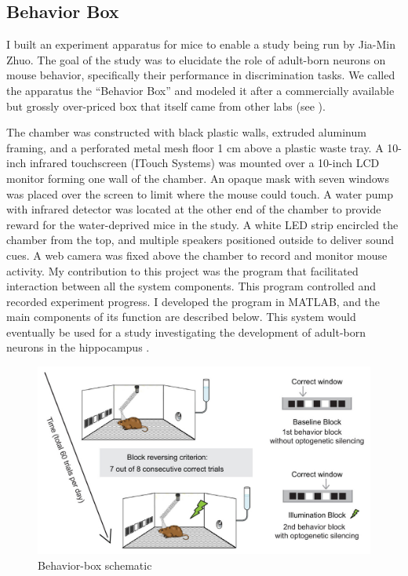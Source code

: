 \subsection{Behavior Box}\label{sec:behavior-box}

I built an experiment apparatus for mice to enable a study being run by Jia-Min Zhuo.
The goal of the study was to elucidate the role of adult-born neurons on mouse behavior, specifically their performance in discrimination tasks.
We called the apparatus the ``Behavior Box'' and modeled it after a commercially available but grossly over-priced box that itself came from other labs (see \cite{McLelland_2015}).

The chamber was constructed with black plastic walls, extruded aluminum framing, and a perforated metal mesh floor 1 cm above a plastic waste tray.
A 10-inch infrared touchscreen (ITouch Systems) was mounted over a 10-inch LCD monitor forming one wall of the chamber.
An opaque mask with seven windows was placed over the screen to limit where the mouse could touch.
A water pump with infrared detector was located at the other end of the chamber to provide reward for the water-deprived mice in the study.
A white LED strip encircled the chamber from the top, and multiple speakers positioned outside to deliver sound cues.
A web camera was fixed above the chamber to record and monitor mouse activity.
My contribution to this project was the program that facilitated interaction between all the system components.
This program controlled and recorded experiment progress.
I developed the program in MATLAB, and the main components of its function are described below.
This system would eventually be used for a study investigating the development of adult-born neurons in the hippocampus \cite{Zhuo_2016}.

\begin{figure}
	\includegraphics[width=15cm]{figures/task-schematic.jpg}
	\caption{Behavior-box schematic}
	\label{fig:behaviorbox-schematic}
\end{figure}

